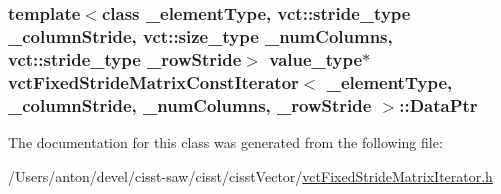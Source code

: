 \subsubsection[{Data\+Ptr}]{\setlength{\rightskip}{0pt plus 5cm}template$<$class \+\_\+element\+Type, vct\+::stride\+\_\+type \+\_\+column\+Stride, vct\+::size\+\_\+type \+\_\+num\+Columns, vct\+::stride\+\_\+type \+\_\+row\+Stride$>$ value\+\_\+type$\ast$ {\bf vct\+Fixed\+Stride\+Matrix\+Const\+Iterator}$<$ \+\_\+element\+Type, \+\_\+column\+Stride, \+\_\+num\+Columns, \+\_\+row\+Stride $>$\+::Data\+Ptr\hspace{0.3cm}{\ttfamily [protected]}}\label{classvct_fixed_stride_matrix_const_iterator_afcb4fd9b3a426eaa6b28e36d741a4b24}


The documentation for this class was generated from the following file\+:\begin{DoxyCompactItemize}
\item 
/\+Users/anton/devel/cisst-\/saw/cisst/cisst\+Vector/\hyperlink{vct_fixed_stride_matrix_iterator_8h}{vct\+Fixed\+Stride\+Matrix\+Iterator.\+h}\end{DoxyCompactItemize}
